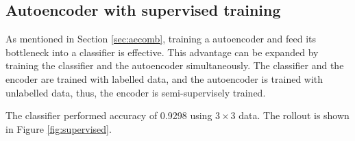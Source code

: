 \documentclass{article}
\begin{document}
    \subsection{Autoencoder with supervised training}
        As mentioned in Section \ref{sec:aecomb},
        training a autoencoder and feed its bottleneck into a classifier is effective.
        This advantage can be expanded by training the classifier and the autoencoder simultaneously.
        The classifier and the encoder are trained with labelled data,
        and the autoencoder is trained with unlabelled data,
        thus, the encoder is semi-supervisely trained.
        
        The classifier performed accuracy of 0.9298 using $3\times 3$ data.
        The rollout is shown in Figure \ref{fig:supervised}.
\end{document}
